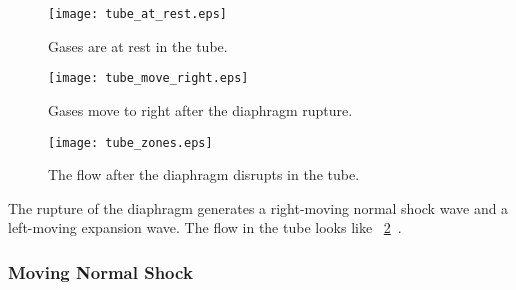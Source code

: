 \documentclass{turgon}
\begin{document}
\begin{figure}[h]
  \centering
  \texttt{[image: tube\_at\_rest.eps]}
  \caption{Gases are at rest in the tube.}
  \label{f:tube_at_rest}
  \texttt{[image: tube\_move\_right.eps]}
  \caption{Gases move to right after the diaphragm rupture.}
  \label{f:tube_move_right}
\end{figure}

\begin{figure}[h]
  \centering
  \texttt{[image: tube\_zones.eps]}
  \caption{The flow after the diaphragm disrupts in the tube.}
  \label{f:tube_zones}
\end{figure}

The rupture of the diaphragm generates a right-moving normal shock wave and a
left-moving expansion wave.
The flow in the tube looks like
\figurename~\ref{f:tube_zones}~\citep{anderson_modern_2003}.

\subsubsection{Moving Normal Shock}
\end{document}
